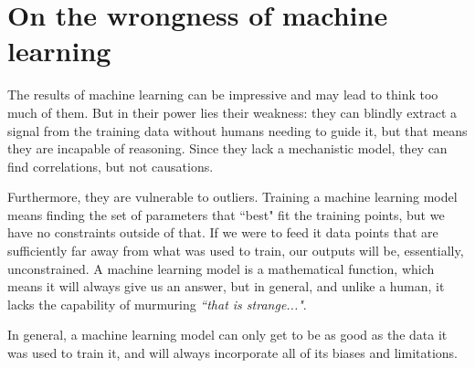 \begin{center}
\end{center}



\section{On the wrongness of machine learning}\label{sec:wrong}
The results of machine learning can be impressive and may lead to think too much of them.
But in their power lies their weakness: they can blindly extract a signal from the training data without humans needing to guide it, but that means they are incapable of reasoning.
Since they lack a mechanistic model, they can find correlations, but not causations.

Furthermore, they are vulnerable to outliers.
Training a machine learning model means finding the set of parameters that ``best" fit the training points, but we have no constraints outside of that.
If we were to feed it data points that are sufficiently far away from what was used to train, our outputs will be, essentially, unconstrained.
A machine learning model is a mathematical function, which means it will always give us an answer, but in general, and unlike a human, it lacks the capability of murmuring \emph{``that is strange..."}.

In general, a machine learning model can only get to be as good as the data it was used to train it, and will always incorporate all of its biases and limitations.

